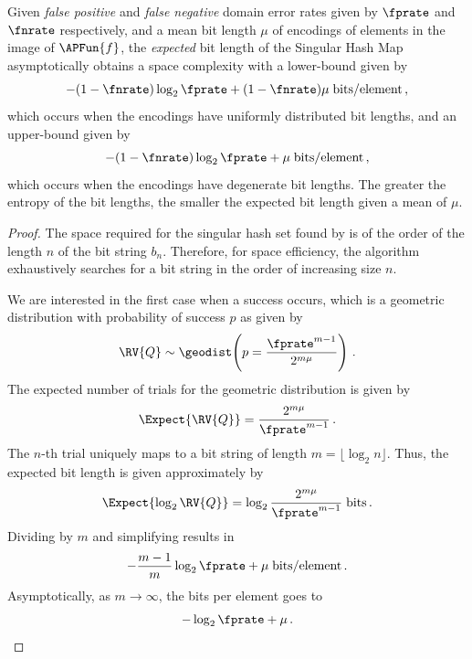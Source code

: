 \documentclass[ ../main.tex]{subfiles}
\begin{document}
\begin{theorem}
Given \emph{false positive} and \emph{false negative} domain error rates given by $\fprate$ and $\fnrate$ respectively, and a mean bit length $\mu$ of encodings of elements in the image of $\APFun{f}$, the \emph{expected} bit length of the Singular Hash Map asymptotically obtains a space complexity with a lower-bound given by
\begin{equation}
    -(1 - \fnrate) \log_2 \fprate + (1 - \fnrate) \mu \; \si{bits \per element}\,,
\end{equation}
which occurs when the encodings have uniformly distributed bit lengths, and an upper-bound given by
\begin{equation}
    -(1 - \fnrate) \log_2 \fprate + \mu \; \si{bits \per element}\,,
\end{equation}
which occurs when the encodings have degenerate bit lengths. The greater the entropy of the bit lengths, the smaller the expected bit length given a mean of $\mu$.
\end{theorem}
\begin{proof}
The space required for the singular hash set found by  is of the order of the length $n$ of the bit string $b_n$.
Therefore, for space efficiency, the algorithm exhaustively searches for a bit string in the order of increasing size $n$.

We are interested in the first case when a success occurs, which is a geometric distribution with probability of success $p$ as given by
\begin{equation}
    \RV{Q} \sim \geodist\!\left(p = \frac{\fprate^{m-1}}{2^{m \mu}}\right)\,.
\end{equation}
The expected number of trials for the geometric distribution is given by
\begin{equation}
\label{eq:exp_trials}
    \Expect{\RV{Q}} = \frac{2^{m \mu}}{\fprate^{m-1}}\,.
\end{equation}
The $n$-th trial uniquely maps to a bit string of length $m = \lfloor \log_2 n \rfloor$.
Thus, the expected bit length is given approximately by
\begin{equation}
    \Expect{\log_2 \RV{Q}} = \log_2 \frac{2^{m \mu}}{\fprate^{m-1}}\; \si{bits}\,.
\end{equation}
Dividing by $m$ and simplifying results in
\begin{equation}
    -\frac{m-1}{m} \log_2 \fprate + \mu\; \si{bits \per element}\,.
\end{equation}
Asymptotically, as $m \to \infty$, the bits per element goes to
\begin{equation}
    -\log_2 \fprate + \mu\,.
\end{equation}
\end{proof}
\end{document}
